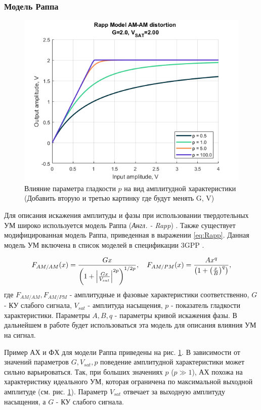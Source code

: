 \subsubsection{Модель Раппа}
\begin{figure}[h!]
    \centering
    \includegraphics[width=0.7\linewidth]{figs/rapp_p.png}
    \caption{Влияние параметра гладкости $p$ на вид амплитудной
    характеристики (Добавить вторую и третью картинку где будут менять G, V)}
    \label{fig:rapp_p_parameters}
\end{figure}
Для описания искажения амплитуды и фазы при использовании твердотельных УМ
широко используется модель Раппа (\textit{Англ. - Rapp}) \cite{Rapp1991} \cite{Maltsev2010}.
Также существует модифицированная модель Раппа, приведенная в выражении
\ref{eq:Rapp}. Данная модель УМ включена в список моделей в спецификации
3GPP \cite{3gpp.38.803}.

\begin{equation}
    F_{AM/AM}(x) = \frac{G x}{\left( 1 + \abs{\frac{Gx}{V_{sat}}}^{2p}\right)^{1/2p}},
    \quad 
    F_{AM/PM}(x) = \frac{Ax^q}{\left(1+\left(\frac{x}{B}\right)^q\right)},
    \label{eq:Rapp}
\end{equation}
где $F_{AM/AM}, F_{AM/PM}$ - амплитудные и фазовые характеристики
соответственно, $G$ - КУ слабого сигнала, $V_{sat}$ - амплитуда насыщения,
$p$ - показатель гладкости характеристики. Параметры $A,B,q$ - параметры
кривой искажения фазы. В дальнейшем в работе будет использоваться эта
модель для описания влияния УМ на сигнал.

Пример АХ и ФХ для модели Раппа приведены на  рис. \ref{fig:rapp_p_parameters}.
В зависимости от значений параметров $G, V_{sat}, p$ поведение амплитудной
характеристики может сильно варьироваться. Так, при больших значениях $p$
($p\gg 1$), АХ похожа на характеристику идеального УМ, которая ограничена
по максимальной выходной амплитуде (см. рис. \ref{fig:rapp_p_parameters}).
Параметр $V_{sat}$ отвечает за выходную амплитуду насыщения, а $G$ - КУ
слабого сигнала.


